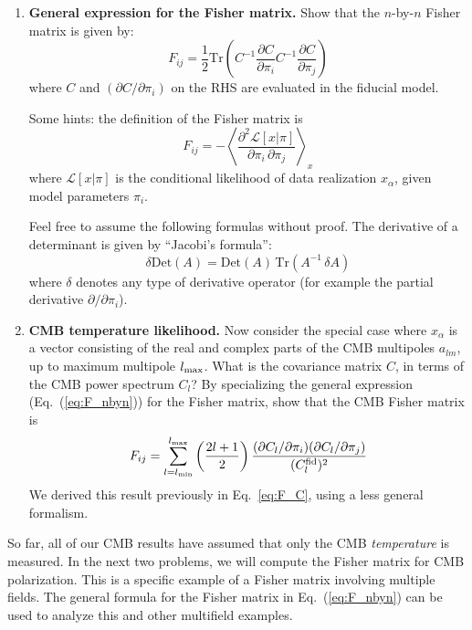 \documentclass[aps,prd,superscriptaddress,groupedaddress,nofootinbib,nobibnotes]{revtex4}
\newcommand{\be}{\begin{equation}}
\newcommand{\ee}{\end{equation}}
\def\L{{\mathcal L}}
\begin{document}
\begin{enumerate}

\item {\bf General expression for the Fisher matrix.}
Show that the $n$-by-$n$ Fisher matrix is given by:
\be
F_{ij} = \frac{1}{2} \mbox{Tr} \left( C^{-1} \frac{\partial C}{\partial\pi_i} C^{-1} \frac{\partial C}{\partial\pi_j} \right)  \label{eq:F_nbyn}
\ee
where $C$ and $(\partial C / \partial\pi_i)$ on the RHS are evaluated in the fiducial model.

Some hints: the definition of the Fisher matrix is
\be
F_{ij} = -\left\langle \frac{\partial^2 \L[x|\pi]}{\partial\pi_i \, \partial\pi_j} \right\rangle_x
\ee
where $\L[x|\pi]$ is the conditional likelihood of data realization $x_\alpha$, given model parameters $\pi_i$.

Feel free to assume the following formulas without proof.
The derivative of a determinant is given by ``Jacobi's formula'':
\be
\delta \mbox{Det}(A) = \mbox{Det}(A) \, \mbox{Tr}(A^{-1} \, \delta A)
\ee
where $\delta$ denotes any type of derivative operator (for example the partial derivative $\partial/\partial\pi_i$).

\item {\bf CMB temperature likelihood.}
Now consider the special case where $x_\alpha$ is a vector consisting of the real and complex parts of the CMB multipoles $a_{lm}$,
up to maximum multipole $l_{\rm max}$.  What is the covariance matrix $C$, in terms of the CMB power spectrum $C_l$?  By specializing
the general expression (Eq.~(\ref{eq:F_nbyn})) for the Fisher matrix, show that the CMB Fisher matrix is
\be
F_{ij} = \sum_{l=l_{\rm min}}^{l_{\rm max}} \left( \frac{2l+1}{2} \right) \frac{(\partial C_l / \partial\pi_i)(\partial C_l/\partial\pi_j)}{(C_l^{\rm fid})^2}
\ee
We derived this result previously in Eq.~\ref{eq:F_C}, using a less general formalism.
\setcounter{enumi_save}{\value{enumi}}
\end{enumerate}

\par\noindent
So far, all of our CMB results have assumed that only the CMB {\em temperature} is measured.
In the next two problems, we will compute the Fisher matrix for CMB polarization.
This is a specific example of a Fisher matrix involving multiple fields.
The general formula for the Fisher matrix in Eq.~(\ref{eq:F_nbyn}) can be used to analyze
this and other multifield examples.
\end{document}
